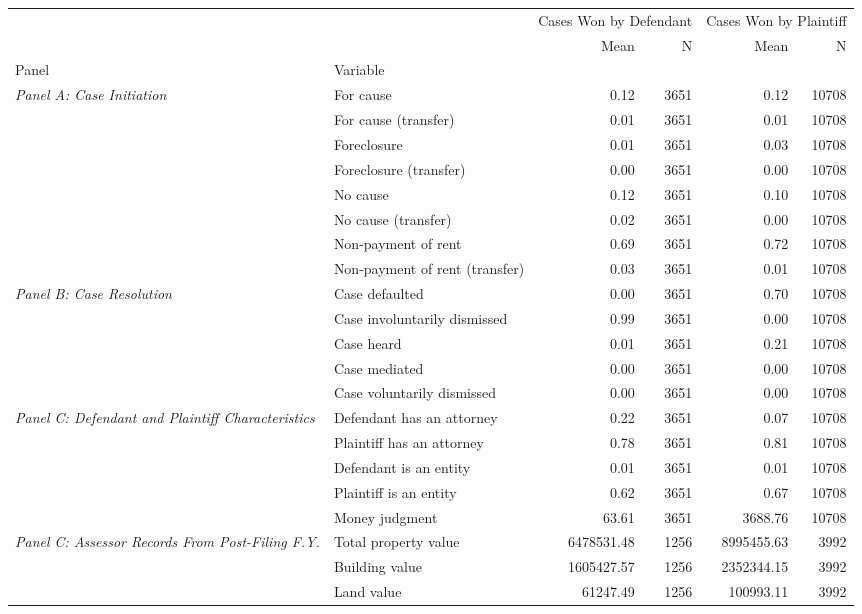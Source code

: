 \begin{tabular}{llrrrr}
\toprule
 &  & \multicolumn{2}{c}{Cases Won by Defendant} & \multicolumn{2}{c}{Cases Won by Plaintiff} \\
 &  & Mean & N & Mean & N \\
Panel & Variable &  &  &  &  \\
\midrule
\multirow[c]{8}{4cm}{\textit{Panel A: Case Initiation}} & For cause & 0.12 & 3651 & 0.12 & 10708 \\
 & For cause (transfer) & 0.01 & 3651 & 0.01 & 10708 \\
 & Foreclosure & 0.01 & 3651 & 0.03 & 10708 \\
 & Foreclosure (transfer) & 0.00 & 3651 & 0.00 & 10708 \\
 & No cause & 0.12 & 3651 & 0.10 & 10708 \\
 & No cause (transfer) & 0.02 & 3651 & 0.00 & 10708 \\
 & Non-payment of rent & 0.69 & 3651 & 0.72 & 10708 \\
 & Non-payment of rent (transfer) & 0.03 & 3651 & 0.01 & 10708 \\
\cline{1-6}
\multirow[c]{5}{4cm}{\textit{Panel B: Case Resolution}} & Case defaulted & 0.00 & 3651 & 0.70 & 10708 \\
 & Case involuntarily dismissed & 0.99 & 3651 & 0.00 & 10708 \\
 & Case heard & 0.01 & 3651 & 0.21 & 10708 \\
 & Case mediated & 0.00 & 3651 & 0.00 & 10708 \\
 & Case voluntarily dismissed & 0.00 & 3651 & 0.00 & 10708 \\
\cline{1-6}
\multirow[c]{5}{4cm}{\textit{Panel C: Defendant and Plaintiff Characteristics}} & Defendant has an attorney & 0.22 & 3651 & 0.07 & 10708 \\
 & Plaintiff has an attorney & 0.78 & 3651 & 0.81 & 10708 \\
 & Defendant is an entity & 0.01 & 3651 & 0.01 & 10708 \\
 & Plaintiff is an entity & 0.62 & 3651 & 0.67 & 10708 \\
 & Money judgment & 63.61 & 3651 & 3688.76 & 10708 \\
\cline{1-6}
\multirow[c]{5}{4cm}{\textit{Panel C: Assessor Records From Post-Filing F.Y.}} & Total property value & 6478531.48 & 1256 & 8995455.63 & 3992 \\
 & Building value & 1605427.57 & 1256 & 2352344.15 & 3992 \\
 & Land value & 61247.49 & 1256 & 100993.11 & 3992 \\

\end{tabular}
